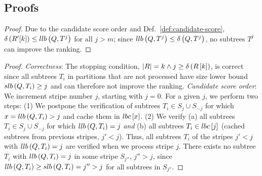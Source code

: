 \subsection{Proofs}
\label{sec:proofs}

\lemmaearlytermination*

\begin{proof}
Due to the candidate score order and Def.~\ref{def:candidate-score}, $\delta \left( R'[k] \right)\leq llb \left( Q, T^j \right)$ for all $j>m$; since $llb \left( Q, T^j \right)\leq \delta \left( Q, T^j \right)$, no subtrees $T^j$ can improve the ranking.
\end{proof}

\theoremmergeallecorrectnessscoreorder*

\begin{proof}
\emph{Correctness}: The stopping condition, $\left| R \right| = k \land j \geq \delta \left( R\left[ k \right] \right)$, is correct since all subtrees $T_i$ in partitions that are not processed have size lower bound $slb \left( Q, T_i \right) \geq j$  and can therefore not improve the ranking. \emph{Candidate score order}: We increment stripe number $j$, starting with $j = 0$.
For a given $j$, we perform two steps: (1) We postpone the verification of subtrees $T_i \in S_j \cup S_{-j}$ for which $x = llb \left( Q, T_i \right) > j$ and cache them in $lbc\left[ x \right]$. (2) We verify (a) all subtrees $T_i \in S_j \cup S_{-j}$ for which $llb \left( Q, T_i \right) = j$ \emph{and} (b) all subtrees $T_i \in lbc\left[ j \right]$ (cached subtrees from previous stripes, $j' < j$).
Thus, all subtrees $T_i$ of the stripes $j' < j$ with $llb \left( Q, T_i \right) = j$ are verified when we process stripe $j$. There exists no subtree $T_i$ with $llb \left( Q, T_i \right) = j$ in some stripe $S_{j''}$, $j'' > j$, since $llb \left( Q, T_i \right) \geq slb \left( Q, T_i \right) = j'' > j$ for all subtrees in $S_{j''}$.
\end{proof}

\theoremsizeinterval*

